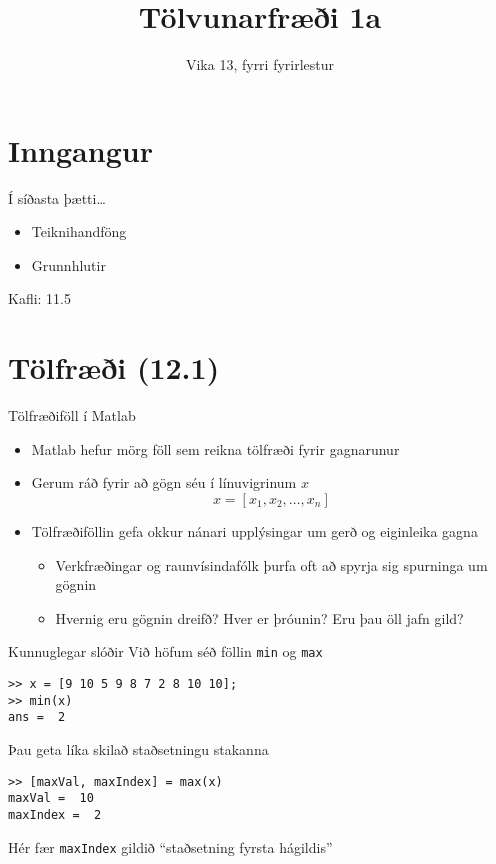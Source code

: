 \documentclass{beamer}
\title{Tölvunarfræði 1a}
\subtitle{Vika 13, fyrri fyrirlestur}
\begin{document}
\begin{frame}
\titlepage
\end{frame}

\section{Inngangur}

\begin{frame}{Í síðasta þætti\ldots}
\begin{itemize}
 \item Teiknihandföng
 \item Grunnhlutir 
\end{itemize}
Kafli: 11.5
\end{frame}

\section{Tölfræði (12.1)}

\begin{frame}{Tölfræðiföll í Matlab}
\begin{itemize}
 \item Matlab hefur mörg föll sem reikna tölfræði fyrir gagnarunur
 \item Gerum ráð fyrir að gögn séu í línuvigrinum $x$
\[
 x = [x_1,x_2, \ldots, x_n]
\]
 \item Tölfræðiföllin gefa okkur nánari upplýsingar um gerð og eiginleika gagna
 \begin{itemize}
  \item Verkfræðingar og raunvísindafólk þurfa oft að spyrja sig spurninga um gögnin
  \item Hvernig eru gögnin dreifð? Hver er þróunin? Eru þau öll jafn gild?
 \end{itemize}
\end{itemize}

\end{frame}

\begin{frame}[fragile]{Kunnuglegar slóðir}
\vspace{\baselineskip}
Við höfum séð föllin \texttt{min} og \texttt{max}
\begin{verbatim}
>> x = [9 10 5 9 8 7 2 8 10 10];
>> min(x)
ans =  2
\end{verbatim}
Þau geta líka skilað staðsetningu stakanna
\begin{verbatim}
>> [maxVal, maxIndex] = max(x)
maxVal =  10
maxIndex =  2
\end{verbatim}
Hér fær \texttt{maxIndex} gildið ``staðsetning fyrsta hágildis''
\end{frame}
\end{document}
